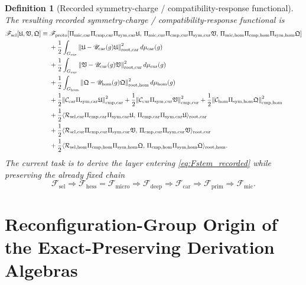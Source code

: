 \documentclass[11pt]{article}
\newcommand{\MicFunctional}{\mathscr F_{\mathrm{mic}}}
\newcommand{\PrimFunctional}{\mathscr F_{\mathrm{prim}}}
\newcommand{\CarrierFunctional}{\mathscr F_{\mathrm{car}}}
\newcommand{\DeepFunctional}{\mathscr F_{\mathrm{deep}}}
\newcommand{\ProtoFunctional}{\mathscr F_{\mathrm{proto}}}
\newcommand{\UltraFunctional}{\mathscr F_{\mathrm{micro}}}
\newcommand{\RootFunctional}{\mathscr F_{\mathrm{hess}}}
\newcommand{\StemFunctional}{\mathscr F_{\mathrm{sel}}}
\newcommand{\UltraCarProj}{\Pi_{\mathrm{mic,car}}}
\newcommand{\UltraCurProj}{\Pi_{\mathrm{mic,cur}}}
\newcommand{\UltraHomProj}{\Pi_{\mathrm{mic,hom}}}
\newcommand{\RootTensor}{\mathfrak U}
\newcommand{\RootRelabel}{\mathfrak V}
\newcommand{\RootFree}{\mathfrak Q}
\newcommand{\TensorSymProj}{\Pi_{\mathrm{sym,car}}}
\newcommand{\CurSymProj}{\Pi_{\mathrm{sym,cur}}}
\newcommand{\HomSymProj}{\Pi_{\mathrm{sym,hom}}}
\newcommand{\TensorCompat}{\mathcal C_{\mathrm{car}}}
\newcommand{\CurCompat}{\mathcal C_{\mathrm{cur}}}
\newcommand{\HomCompat}{\mathcal C_{\mathrm{hom}}}
\newcommand{\TensorCmpProj}{\Pi_{\mathrm{cmp,car}}}
\newcommand{\CurCmpProj}{\Pi_{\mathrm{cmp,cur}}}
\newcommand{\HomCmpProj}{\Pi_{\mathrm{cmp,hom}}}
\newcommand{\TensorSymGroup}{G_{\mathrm{car}}}
\newcommand{\CurSymGroup}{G_{\mathrm{cur}}}
\newcommand{\HomSymGroup}{G_{\mathrm{hom}}}
\newcommand{\TensorSymAct}{\mathscr U_{\mathrm{car}}}
\newcommand{\CurSymAct}{\mathscr U_{\mathrm{cur}}}
\newcommand{\HomSymAct}{\mathscr U_{\mathrm{hom}}}
\newcommand{\TensorResp}{\mathcal R_{\mathrm{sel,car}}}
\newcommand{\CurResp}{\mathcal R_{\mathrm{sel,cur}}}
\newcommand{\HomResp}{\mathcal R_{\mathrm{sel,hom}}}
\newtheorem{definition}{Definition}
\begin{document}
\begin{definition}[Recorded symmetry-charge / compatibility-response functional]
\label{def:recorded_functional}
The resulting recorded symmetry-charge / compatibility-response functional is
\begin{equation}
\begin{aligned}
\StemFunctional[\RootTensor,\RootRelabel,\RootFree]
\equiv\;
&\ProtoFunctional[
\UltraCarProj\TensorCmpProj\TensorSymProj\RootTensor,\,
\UltraCurProj\CurCmpProj\CurSymProj\RootRelabel,\,
\UltraHomProj\HomCmpProj\HomSymProj\RootFree]
\\
&+\frac12\int_{\TensorSymGroup}
\norm{\RootTensor-\TensorSymAct(g)\RootTensor}_{\mathrm{root,car}}^2\,
d\mu_{\mathrm{car}}(g)
\\
&+\frac12\int_{\CurSymGroup}
\norm{\RootRelabel-\CurSymAct(g)\RootRelabel}_{\mathrm{root,cur}}^2\,
d\mu_{\mathrm{cur}}(g)
\\
&+\frac12\int_{\HomSymGroup}
\norm{\RootFree-\HomSymAct(g)\RootFree}_{\mathrm{root,hom}}^2\,
d\mu_{\mathrm{hom}}(g)
\\
&+\frac12\norm{\TensorCompat\TensorSymProj\RootTensor}_{\mathrm{cmp,car}}^2
+\frac12\norm{\CurCompat\CurSymProj\RootRelabel}_{\mathrm{cmp,cur}}^2
+\frac12\norm{\HomCompat\HomSymProj\RootFree}_{\mathrm{cmp,hom}}^2
\\
&+\frac12\langle \TensorResp\TensorCmpProj\TensorSymProj\RootTensor,\,
\TensorCmpProj\TensorSymProj\RootTensor\rangle_{\mathrm{root,car}}
\\
&+\frac12\langle \CurResp\CurCmpProj\CurSymProj\RootRelabel,\,
\CurCmpProj\CurSymProj\RootRelabel\rangle_{\mathrm{root,cur}}
\\
&+\frac12\langle \HomResp\HomCmpProj\HomSymProj\RootFree,\,
\HomCmpProj\HomSymProj\RootFree\rangle_{\mathrm{root,hom}}.
\end{aligned}
\label{eq:Fstem_recorded}
\end{equation}
The current task is to derive the layer entering \eqref{eq:Fstem_recorded} while preserving the already fixed chain
\begin{equation}
\StemFunctional
\Longrightarrow
\RootFunctional=\UltraFunctional
\Longrightarrow
\DeepFunctional
\Longrightarrow
\CarrierFunctional
\Longrightarrow
\PrimFunctional
\Longrightarrow
\MicFunctional.
\label{eq:chain}
\end{equation}
\end{definition}

\section{Reconfiguration-Group Origin of the Exact-Preserving Derivation Algebras}
\end{document}
